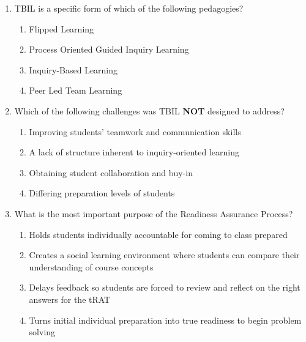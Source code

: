 \documentclass{article}
\begin{document}
\begin{enumerate}[itemsep=0.5in]
    \item TBIL is a specific form of which of the following pedagogies?


          \begin{enumerate}[label=\Alph*)]
              
            \item Flipped Learning
            \item Process Oriented Guided Inquiry Learning
          \item Inquiry-Based Learning %
              \item Peer Led Team Learning
              

          \end{enumerate}


     \item Which of the following challenges was TBIL \textbf{NOT} designed to address?

                  \begin{enumerate}[label=\Alph*)]
                      \item Improving students' teamwork and communication skills %
                      \item A lack of structure inherent to inquiry-oriented learning
                      \item Obtaining student collaboration and buy-in
                      \item Differing preparation levels of students
                      
                  \end{enumerate}
                  
\newpage

\item What is the most important purpose of the Readiness Assurance Process?
                  \begin{enumerate}[label=\Alph*)]
\item Holds students individually accountable for coming to class prepared
\item Creates a social learning environment where students can compare their understanding of course concepts
\item Delays feedback so students are forced to review and reflect on the right answers for the tRAT
\item Turns initial individual preparation into true readiness to begin problem solving %
\end{enumerate}


\end{enumerate}
\end{document}
